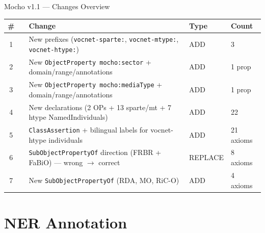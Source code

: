 \documentclass[xcolor,aspectratio=169,compress]{beamer}
\begin{document}
\begin{frame}{Mocho v1.1 --- Changes Overview}
  \small
  \begin{tabular}{clp{6.5cm}ll}
    \toprule
    \# & & Change & Type & Count \\
    \midrule
    1 & & New prefixes (\texttt{vocnet-sparte:}, \texttt{vocnet-mtype:}, \texttt{vocnet-htype:})
        & ADD & 3 \\
    2 & & New \texttt{ObjectProperty mocho:sector} + domain/range/annotations
        & ADD & 1 prop \\
    3 & & New \texttt{ObjectProperty mocho:mediaType} + domain/range/annotations
        & ADD & 1 prop \\
    4 & & New declarations (2 OPs + 13 sparte/mt + 7 htype NamedIndividuals)
        & ADD & 22 \\
    5 & & \texttt{ClassAssertion} + bilingual labels for vocnet-htype individuals
        & ADD & 21 axioms \\
    6 & & \texttt{SubObjectPropertyOf} direction (FRBR + FaBiO) --- wrong $\to$ correct
        & REPLACE & 8 axioms \\
    7 & & New \texttt{SubObjectPropertyOf} (RDA, MO, RiC-O)
        & ADD & 4 axioms \\
    \bottomrule
  \end{tabular}
\end{frame}



\section{NER Annotation}
\end{document}
